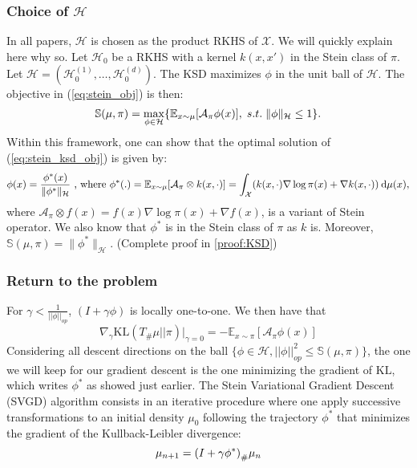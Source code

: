 \documentclass[runningheads,a4paper]{llncs}
\newcommand{\E}{\mathbb{E}}
\renewcommand{\S}{\mathbb{S}}
\newcommand{\X}{\mathcal{X}}
\newcommand{\A}{\mathcal{A}}
\newcommand{\KL}{\mathrm{KL}}
\renewcommand{\H}{\mathcal{H}}
\renewcommand{\S}{\mathbb{S}}
\renewcommand{\d}{\: \mathrm{d}}
\DeclarePairedDelimiter{\pare}{(}{)}
\DeclarePairedDelimiter{\bra}{\{}{\}}
\DeclarePairedDelimiter{\sq}{[}{]}
\begin{document}
\subsubsection{Choice of $\H$}\label{sec:RKHS}
In all papers, $\H$ is chosen as the product RKHS of $\X$. We will quickly explain here why so. \newline
Let $\H_0$ be a RKHS with a kernel $k(x, x')$ in the Stein class of $\pi$.
Let $\H = (\H^{(1)}_0, \dots, \H^{(d)}_0)$. The KSD maximizes $\phi$ in the unit ball of $\H$.
The objective in (\ref{eq:stein_obj}) is then:
\begin{equation}
  \S(\mu, \pi) =
    \max_{\phi \in \H} \bra*{ \E_{x \sim \mu}[\A_\pi \phi (x)], \; s.t. \; \|\phi\|_{\H} \leq 1 }.
  \label{eq:stein_ksd_obj}
\end{equation}
Within this framework, one can show that the optimal solution of (\ref{eq:stein_ksd_obj})
is given by:
\begin{equation}
  \phi(x) = \frac{\phi^*(x)}{\|\phi^*\|_{\H}}
    \text{ , where } \phi^*(.) = \E_{x \sim \mu}\sq*{ \A_\pi \otimes k(x, \cdot) }
                               = \int_\X (k(x, \cdot) \nabla \log \pi(x) + \nabla k(x, \cdot)) \d \mu(x),
  \label{eq:stein_ksd_sol}        
\end{equation}
where $\A_\pi \otimes f(x) =  f(x) \nabla \log \pi(x) + \nabla f(x)$, is a variant of Stein operator. We also know that $\phi^*$ is in the Stein class of $\pi$ as $k$ is.
Moreover, $\S(\mu, \pi) = \|\phi^*\|_\H$. (Complete proof in \ref{proof:KSD})
\subsubsection{Return to the problem}
For $\gamma < \frac{1}{||\phi||_{op}}$, $(I+\gamma \phi)$ is locally one-to-one. We then have that $$\nabla_\gamma \KL(T_\#\mu||\pi)|_{\gamma = 0} = - \E_{x\sim \pi}[\A_\pi \phi(x)]$$ 
Considering all descent directions on the ball $\{\phi\in \H, ||\phi||^2_{op} \leq \S(\mu,\pi)\}$, the one we will keep for our gradient descent is the one minimizing the gradient of $\KL$, which writes $\phi^*$ as showed just earlier. \newline
The Stein Variational Gradient Descent (SVGD) algorithm consists
in an iterative procedure where one apply successive transformations
to an initial density $\mu_0$ following
the trajectory $\phi^*$ that minimizes the gradient of the Kullback-Leibler divergence:
\begin{equation}
  \mu_{n+1} = \pare*{ I + \gamma \phi^* }_\# \mu_n
\end{equation}
\end{document}
